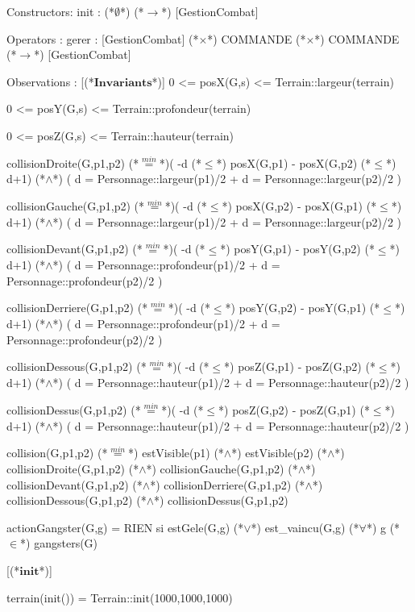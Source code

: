 \documentclass[a4paper, 11pt, notitlepage]{report}
\newcommand{\specB}[1]{\textbf{#1}}
\begin{document}
\begin{landscape}
\begin{Spe}
Constructors:
      init : (*$\emptyset$*) (*$\rightarrow$*) [GestionCombat]
      
Operators :
      gerer : [GestionCombat] (*$\times$*) COMMANDE (*$\times$*) COMMANDE (*$\rightarrow$*) [GestionCombat]

Observations : 
      [(*$\specB{Invariants}$*)]
      	0 <= posX(G,s) <= Terrain::largeur(terrain)
	
      	0 <= posY(G,s) <= Terrain::profondeur(terrain)
	
      	0 <= posZ(G,s) <= Terrain::hauteur(terrain)
	
	collisionDroite(G,p1,p2) (*$\stackrel{min}{=}$*)( -d (*$\le$*) posX(G,p1) - posX(G,p2) (*$\le$*) d+1) (*$\land$*) ( d = Personnage::largeur(p1)/2 + d = Personnage::largeur(p2)/2 )

	collisionGauche(G,p1,p2) (*$\stackrel{min}{=}$*)( -d (*$\le$*) posX(G,p2) - posX(G,p1) (*$\le$*) d+1) (*$\land$*) ( d = Personnage::largeur(p1)/2 + d = Personnage::largeur(p2)/2 )

	collisionDevant(G,p1,p2) (*$\stackrel{min}{=}$*)( -d (*$\le$*) posY(G,p1) - posY(G,p2) (*$\le$*) d+1) (*$\land$*) ( d = Personnage::profondeur(p1)/2 + d = Personnage::profondeur(p2)/2 )

	collisionDerriere(G,p1,p2) (*$\stackrel{min}{=}$*)( -d (*$\le$*) posY(G,p2) - posY(G,p1) (*$\le$*) d+1) (*$\land$*) ( d = Personnage::profondeur(p1)/2 + d = Personnage::profondeur(p2)/2 )

	collisionDessous(G,p1,p2) (*$\stackrel{min}{=}$*)( -d (*$\le$*) posZ(G,p1) - posZ(G,p2) (*$\le$*) d+1) (*$\land$*) ( d = Personnage::hauteur(p1)/2 + d = Personnage::hauteur(p2)/2 )

	collisionDessus(G,p1,p2) (*$\stackrel{min}{=}$*)( -d (*$\le$*) posZ(G,p2) - posZ(G,p1) (*$\le$*) d+1) (*$\land$*) ( d = Personnage::hauteur(p1)/2 + d = Personnage::hauteur(p2)/2 )

	collision(G,p1,p2) (*$\stackrel{min}{=}$*) estVisible(p1) (*$\land$*) estVisible(p2) 
		(*$\land$*) collisionDroite(G,p1,p2) (*$\land$*) collisionGauche(G,p1,p2) 
		(*$\land$*) collisionDevant(G,p1,p2) (*$\land$*) collisionDerriere(G,p1,p2)
		(*$\land$*) collisionDessous(G,p1,p2) (*$\land$*) collisionDessus(G,p1,p2) 
	
	actionGangster(G,g) = RIEN si estGele(G,g) (*$\lor$*) est_vaincu(G,g) (*$\forall$*) g (*$\in$*) gangsters(G)

      [(*$\specB{init}$*)]
    
	terrain(init()) = Terrain::init(1000,1000,1000)
	

\end{Spe}
\end{landscape}
\end{document}
